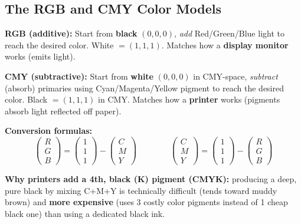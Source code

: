 \documentclass[12pt, a4paper]{article}
\begin{document}
\subsection{The RGB and CMY Color Models}
\begin{keypoints}
  \item \textbf{RGB (additive):} Start from \textbf{black} $(0,0,0)$, \emph{add} Red/Green/Blue light to reach the desired color. White $=(1,1,1)$. Matches how a \textbf{display monitor} works (emits light).
  \item \textbf{CMY (subtractive):} Start from \textbf{white} $(0,0,0)$ in CMY-space, \emph{subtract} (absorb) primaries using Cyan/Magenta/Yellow pigment to reach the desired color. Black $=(1,1,1)$ in CMY. Matches how a \textbf{printer} works (pigments absorb light reflected off paper).
  \item \textbf{Conversion formulas:}
  $$\begin{pmatrix}R\\G\\B\end{pmatrix} = \begin{pmatrix}1\\1\\1\end{pmatrix} - \begin{pmatrix}C\\M\\Y\end{pmatrix} \qquad\qquad \begin{pmatrix}C\\M\\Y\end{pmatrix} = \begin{pmatrix}1\\1\\1\end{pmatrix} - \begin{pmatrix}R\\G\\B\end{pmatrix}$$
  \item \textbf{Why printers add a 4th, black (K) pigment (CMYK):} producing a deep, pure black by mixing C+M+Y is technically difficult (tends toward muddy brown) and \textbf{more expensive} (uses 3 costly color pigments instead of 1 cheap black one) than using a dedicated black ink.
\end{keypoints}
\end{document}
